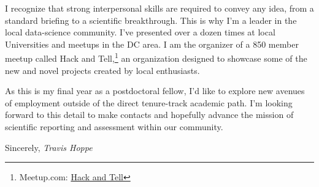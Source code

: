\documentclass[]{scrartcl}
\begin{document}
\begin{cleanCV}
  I recognize that strong interpersonal skills are required to convey any idea, from a standard briefing to a scientific breakthrough.
  This is why I'm a leader in the local data-science community.
  I've presented over a dozen times at local Universities and meetups in the DC area.
  I am the organizer of a 850 member meetup called Hack and Tell,\footnote{
    Meetup.com: \href{http://www.meetup.com/DC-Hack-and-Tell/}{Hack and Tell}
  } an organization designed to showcase some of the new and novel projects created by local enthusiasts.

  As this is my final year as a postdoctoral fellow, I'd like to explore new avenues of employment outside of the direct tenure-track academic path.
  I'm looking forward to this detail to make contacts and hopefully advance the mission of scientific reporting and assessment within our community.

  Sincerely,\newline
  \emph{Travis Hoppe}
  
\end{cleanCV}
\end{document}
